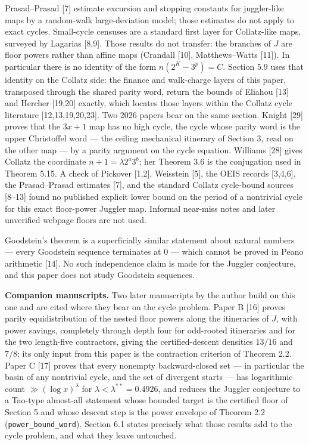 \documentclass[12pt]{article}
\begin{document}
Prasad--Prasad {[}7{]} estimate excursion and stopping constants for
juggler-like maps by a random-walk large-deviation model; those
estimates do not apply to exact cycles. Small-cycle censuses are a
standard first layer for Collatz-like maps, surveyed by Lagarias
{[}8,9{]}. Those results do not transfer: the branches of \(J\) are
floor powers rather than affine maps (Crandall {[}10{]}, Matthews--Watts
{[}11{]}). In particular there is no identity of the form
\(n(2^K-3^p)=C\). Section 5.9 uses that identity on the Collatz side:
the finance and walk-charge layers of this paper, transposed through the
shared parity word, return the bounds of Eliahou {[}13{]} and Hercher
{[}19,20{]} exactly, which locates those layers within the Collatz cycle
literature {[}12,13,19,20,23{]}. Two 2026 papers bear on the same
section. Knight {[}29{]} proves that the \(3x+1\) map has no high cycle,
the cycle whose parity word is the upper Christoffel word --- the
ceiling mechanical itinerary of Section 3, read on the other map --- by
a parity argument on the cycle equation. Williams {[}28{]} gives Collatz
the coordinate \(n+1=\lambda2^a3^b\); her Theorem 3.6 is the conjugation
used in Theorem 5.15. A check of Pickover {[}1,2{]}, Weisstein {[}5{]},
the OEIS records {[}3,4,6{]}, the Prasad--Prasad estimates {[}7{]}, and
the standard Collatz cycle-bound sources {[}8--13{]} found no published
explicit lower bound on the period of a nontrivial cycle for this exact
floor-power Juggler map. Informal near-miss notes and later unverified
webpage floors are not used.

Goodstein's theorem is a superficially similar statement about natural
numbers --- every Goodstein sequence terminates at \(0\) --- which
cannot be proved in Peano arithmetic {[}14{]}. No such independence
claim is made for the Juggler conjecture, and this paper does not study
Goodstein sequences.

\textbf{Companion manuscripts.} Two later manuscripts by the author
build on this one and are cited where they bear on the cycle problem.
Paper B {[}16{]} proves parity equidistribution of the nested floor
powers along the itineraries of \(J\), with power savings, completely
through depth four for odd-rooted itineraries and for the two
length-five contractors, giving the certified-descent densities
\(13/16\) and \(7/8\); its only input from this paper is the contraction
criterion of Theorem 2.2. Paper C {[}17{]} proves that every nonempty
backward-closed set --- in particular the basin of any nontrivial cycle,
and the set of divergent starts --- has logarithmic count
\(\gg(\log x)^{\lambda}\) for \(\lambda<\lambda^{**}=0.4926\), and
reduces the Juggler conjecture to a Tao-type almost-all statement whose
bounded target is the certified floor of Section 5 and whose descent
step is the power envelope of Theorem 2.2
(\texttt{\nolinkurl{power_bound_word}}). Section 6.1 states precisely
what those results add to the cycle problem, and what they leave
untouched.
\end{document}
